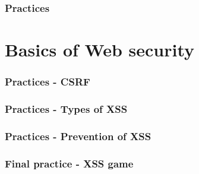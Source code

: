\documentclass[english,10pt]{book}
\newif\ifSOLS
\begin{document}
\subsection{Practices}


\chapter{Basics of Web security\label{chap:web-sec}}




\subsection{Practices - CSRF}



\subsection{Practices - Types  of XSS}






\subsection{Practices - Prevention of XSS}


\subsection{Final practice - XSS game}


\ifSOLS
\chapter{Answers to Practices}
\shipoutExercise
\vspace{0.5cm}
\shipoutAnswer
\fi


%
% 
\end{document}
